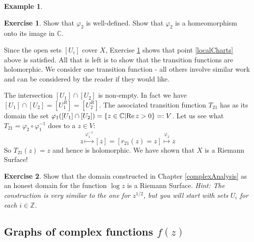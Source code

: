\documentclass[12pt]{book}%
\theoremstyle{plain}
\theoremstyle{definition}
\newtheorem{example}[theorem]{Example}
\newtheorem{exercise}{Exercise}
\theoremstyle{remark}
\def\bC{{\mathbb{C}}}
\def\bZ{{\mathbb{Z}}}
\def\Re{{\textrm{Re\,}}}
\begin{document}
\begin{example}
\begin{exercise}
\label{localChartsForSquareRoot}
Show that $\varphi_2$ is well-defined. Show that $\varphi_2$ is a homeomorphism onto its image in $\bC$.
\end{exercise}

Since the open sets $[U_i]$ cover $X$, Exercise \ref{localChartsForSquareRoot} shows that point \ref{localCharts} above is satisfied. All that is left is to show that the transition functions are holomorphic. We consider one transition function - all others involve similar work and can be considered by the reader if they would like.

The intersection $[U_1] \cap [U_2]$ is non-empty. In fact we have $[U_1] \cap [U_2] = [U^R_1] = [U^R_2]$. The associated transition function $T_{21}$ has as its domain the set $\varphi_1([U_1] \cap [U_2]) = \{z \in \bC|\Re z > 0\} =: V$. Let us see what $T_{21}=\varphi_2 \circ \varphi_1^{-1}$ does to a $z \in V$:
\[
z \stackrel{\varphi_1^{-1}}{\longmapsto}
[z] = [r_{21}(z) = z] 
\stackrel{\varphi_2}{\longmapsto}
z
\]
So $T_{21}(z)=z$ and hence is holomorphic. We have shown that $X$ is a Riemann Surface!
\end{example}



\noindent\hrulefill

\begin{exercise}
Show that the domain constructed in Chapter \ref{complexAnalysis} as an honest domain for the function $\log z$ is a Riemann Surface. \textit{Hint: The construction is very similar to the one for $z^{1/2}$, but you will start with sets $U_i$ for each $i \in \bZ$.}
\end{exercise}





\subsection{Graphs of complex functions $f(z)$}
\end{document}
